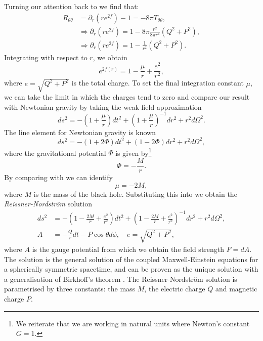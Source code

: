 Turning our attention back to  we find that:
\begin{equation*}
   \begin{aligned}
     R_{\theta \theta} &= \partial_r (re^{2f}) - 1=  -8 \pi  T_{\theta \theta} , \\
     &\Rightarrow \partial_r (re^{2f}) = 1 - 8 \pi \frac{r^2}{8 \pi r^4} (Q^2 + P^2) ,\\
     & \Rightarrow \partial_r (re^{2f}) = 1 - \frac{1}{r^2} (Q^2 + P^2).
   \end{aligned}
\end{equation*}
Integrating with respect to $r$, we obtain
\begin{equation}
\label{eq:rnsol}
   e^{2f(r)} = 1 - \frac{\mu}{r} + \frac{e^2}{r^2},
   \end{equation}
where $e = \sqrt{Q^2 + P^2}$ is the total charge. To set the final integration constant $\mu$, we can take the limit in which the charges tend to zero and compare our result with Newtonian gravity by taking the weak field approximation
\begin{equation}
\label{eq:weakle}
   ds^2 = -\left(1+\frac{\mu}{r}\right)dt^2 + \left(1+\frac{\mu}{r}\right)^{-1} dr^2 + r^2 d\Omega^2.
\end{equation}
The line element for Newtonian gravity is known \cite{Wald:106274}
\begin{equation}
\label{eq:newtle}
   ds^2 = -(1 + 2\Phi) dt^2 + (1 - 2\Phi)dr^2 + r^2 d\Omega^2,
\end{equation}
where the gravitational potential $\Phi$ is given by\footnote{We reiterate that we are working in natural units where Newton's constant $G=1$.}
\begin{equation*}
    \Phi = -\frac{M}{r}.
\end{equation*}
By comparing  with  we can identify
\begin{equation*}
   \mu = -2M,
\end{equation*}
where $M$ is the mass of the black hole. Substituting this into  we obtain the \emph{Reissner-Nordstr\"om} solution
\begin{equation}
\label{eq:rnsolfull}
\begin{aligned}
  ds^2 &=  -\left( 1 - \frac{2M}{r} + \frac{e^2}{r^2} \right) dt^2 + \left( 1 - \frac{2M}{r} + \frac{e^2}{r^2} \right)^{-1} dr^2 + r^2 d\Omega^2	, \\
  A &= - \frac{Q}{r} dt - P \cos \theta d\phi, \quad e = \sqrt{Q^2 + P^2},
\end{aligned}
\end{equation}
where $A$ is the gauge potential from which we obtain the field strength $F = dA$. The solution  is the general solution of the coupled Maxwell-Einstein equations for a spherically symmetric spacetime, and can be proven as the unique solution with a generalisation of Birkhoff's theorem \cite{Ellis:2013dla}. The Reissner-Nordstr\"om solution is parametrised by three constants: the mass $M$, the electric charge $Q$ and magnetic charge $P$. 

